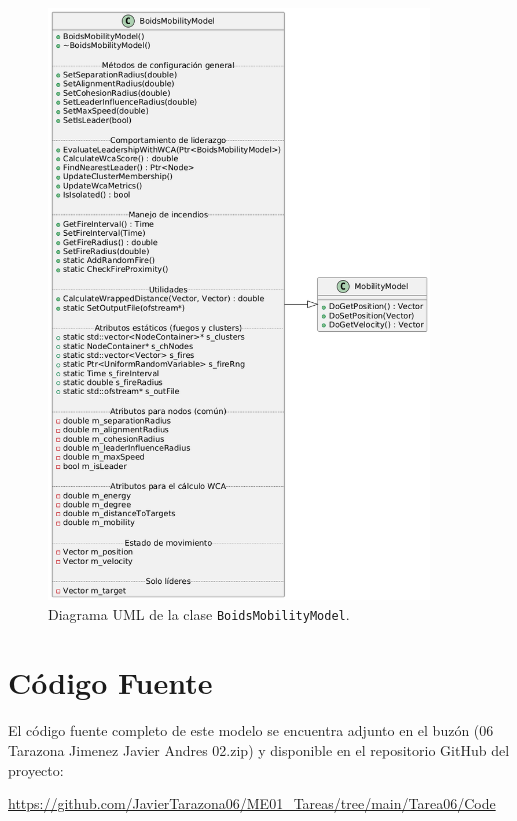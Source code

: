 \documentclass{article}
\begin{document}
\begin{figure}[H]
    \centering
    \includegraphics[width=0.9\textwidth]{BoidsMobilityModel_class.png}
    \caption{Diagrama UML de la clase \texttt{BoidsMobilityModel}.}
    \label{fig:uml-boids}
\end{figure}



\section{Código Fuente}\label{sec:cod}

El código fuente completo de este modelo se encuentra adjunto en el buzón 
(06 Tarazona Jimenez Javier Andres 02.zip)
y disponible en el repositorio GitHub del proyecto:

\begin{center}
\url{https://github.com/JavierTarazona06/ME01_Tareas/tree/main/Tarea06/Code}
\end{center}
\end{document}
